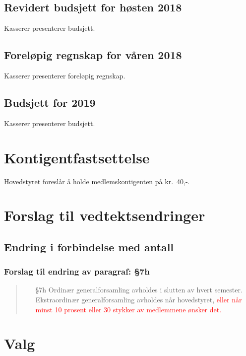 \documentclass[10pt,norsk,a4paper]{article}
\begin{document}
\subsection{Revidert budsjett for høsten 2018}
Kasserer presenterer budsjett.

\subsection{Foreløpig regnskap for våren 2018}
Kasserer presenterer foreløpig regnskap.

\subsection{Budsjett for 2019}
Kasserer presenterer budsjett.

\section{Kontigentfastsettelse}
Hovedstyret foreslår å holde medlemskontigenten på kr.~40,-.

\newpage

\section{Forslag til vedtektsendringer}
\subsection{Endring i forbindelse med antall }
\subsubsection{Forslag til endring av paragraf: §7h}
\begin{quote}
	\begin{enumerate}
		\item[§7h]
            Ordinær generalforsamling avholdes i slutten av hvert semester.
            Ekstraordinær generalforsamling avholdes når hovedstyret,
            \textcolor{red}{eller når minst 10 prosent eller 30 stykker av medlemmene ønsker det.}
	\end{enumerate}
\end{quote}

\newpage

\section{Valg}
\end{document}
